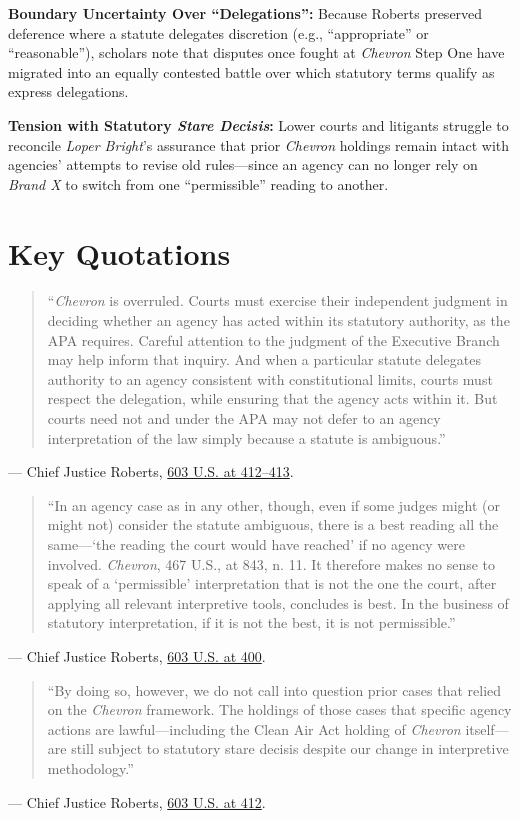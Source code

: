 \documentclass[12pt]{article}
\begin{document}
\textbf{Boundary Uncertainty Over ``Delegations'':} Because Roberts preserved deference where a statute delegates discretion (e.g., ``appropriate'' or ``reasonable''), scholars note that disputes once fought at \textit{Chevron} Step One have migrated into an equally contested battle over which statutory terms qualify as express delegations.

\textbf{Tension with Statutory \textit{Stare Decisis}:} Lower courts and litigants struggle to reconcile \textit{Loper Bright}'s assurance that prior \textit{Chevron} holdings remain intact with agencies' attempts to revise old rules---since an agency can no longer rely on \textit{Brand X} to switch from one ``permissible'' reading to another.

\section{Key Quotations}
\begin{quote}
``\textit{Chevron} is overruled. Courts must exercise their independent judgment in deciding whether an agency has acted within its statutory authority, as the APA requires. Careful attention to the judgment of the Executive Branch may help inform that inquiry. And when a particular statute delegates authority to an agency consistent with constitutional limits, courts must respect the delegation, while ensuring that the agency acts within it. But courts need not and under the APA may not defer to an agency interpretation of the law simply because a statute is ambiguous.''
\end{quote}
\noindent --- Chief Justice Roberts, \href{https://www.law.cornell.edu/supremecourt/text/22-451}{603 U.S. at 412--413}.

\begin{quote}
``In an agency case as in any other, though, even if some judges might (or might not) consider the statute ambiguous, there is a best reading all the same---`the reading the court would have reached' if no agency were involved. \textit{Chevron}, 467 U.S., at 843, n. 11. It therefore makes no sense to speak of a `permissible' interpretation that is not the one the court, after applying all relevant interpretive tools, concludes is best. In the business of statutory interpretation, if it is not the best, it is not permissible.''
\end{quote}
\noindent --- Chief Justice Roberts, \href{https://www.law.cornell.edu/supremecourt/text/22-451}{603 U.S. at 400}.

\begin{quote}
``By doing so, however, we do not call into question prior cases that relied on the \textit{Chevron} framework. The holdings of those cases that specific agency actions are lawful---including the Clean Air Act holding of \textit{Chevron} itself---are still subject to statutory stare decisis despite our change in interpretive methodology.''
\end{quote}
\noindent --- Chief Justice Roberts, \href{https://www.law.cornell.edu/supremecourt/text/22-451}{603 U.S. at 412}.
\end{document}
